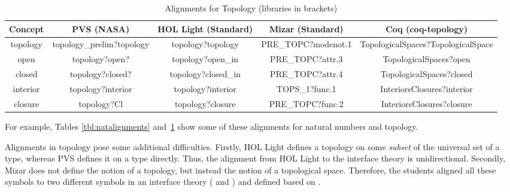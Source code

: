 \begin{table}[ht]\centering\tiny
	\begin{tabular}{|c|c|c|c|c|}\hline
		Concept & PVS (NASA\footnotemark ) & HOL Light (Standard)& Mizar (Standard) &Coq (coq-topology\footnotemark)\\\hline
		\textsf{topology} & \textsf{topology\_prelim?topology} & \textsf{topology?topology} & \textsf{PRE\_TOPC?modenot.1}& \textsf{TopologicalSpaces?TopologicalSpace} \\
		\textsf{open} & \textsf{topology?open?} & \textsf{topology?open\_in} & \textsf{PRE\_TOPC?attr.3} & \textsf{TopologicalSpaces?open} \\
		\textsf{closed} & \textsf{topology?closed?} & \textsf{topology?closed\_in} & \textsf{PRE\_TOPC?attr.4} & \textsf{TopologicalSpaces?closed}\\
		\textsf{interior} & \textsf{topology?interior} & \textsf{topology?interior} & \textsf{TOPS\_1?func.1}& \textsf{InteriorsClosures?interior}   \\
		\textsf{closure} & \textsf{topology?Cl} & \textsf{topology?closure} & \textsf{PRE\_TOPC?func.2 }& \textsf{InteriorsClosures?closure}   \\\hline
	\end{tabular}
	\caption{Alignments for \textsf{Topology} (libraries in brackets)}\label{tbl:topalignments}
\end{table}

For example, Tables \ref{tbl:natalignments} and~\ref{tbl:topalignments} show some of these alignments for natural numbers %
and topology. 

Alignments in topology pose some additional difficulties. Firstly, HOL Light defines a topology on some \emph{subset} of the universal set of a type, whereas PVS defines it on a type directly. Thus, the alignment from HOL Light to the interface theory is unidirectional. Secondly, Mizar does not define the notion of a topology, but instead the notion of a topological space. Therefore, the students aligned all these symbols to two different symbols in an interface theory ( and ) and defined  based on . 

